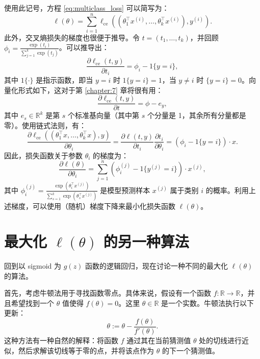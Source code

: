 使用此记号，方程 \eqref{eq:multiclass_loss} 可以简写为：
\begin{equation}
    \ell(\theta) = \sum_{i=1}^n \ell_{\text{ce}}((\theta_1^\top x^{(i)}, \dots, \theta_k^\top x^{(i)}), y^{(i)}).
\end{equation}
此外，交叉熵损失的梯度也很便于推导。令 $t = (t_1, \dots, t_k)$，并回顾 $\phi_i = \frac{\exp(t_i)}{\sum_{j=1}^k \exp(t_j)}$。可以推导出：
\begin{equation}
    \frac{\partial \ell_{\text{ce}}(t, y)}{\partial t_i} = \phi_i - {1}\{y=i\},
\end{equation}
其中 ${1}\{\cdot\}$ 是指示函数，即当 $y=i$ 时 ${1}\{y=i\} = 1$，当 $y \ne i$ 时 $\{y=i\} = 0$。向量化形式如下，这对于第 \ref{chapter:7} 章将很有用：
\begin{equation}
    \frac{\partial \ell_{\text{ce}}(t, y)}{\partial t} = \phi - e_y,\label{eq:2.17}
\end{equation}
其中 $e_s \in \mathbb{R}^k$ 是第 $s$ 个标准基向量（其中第 $s$ 个分量是 1，其余所有分量都是零）。使用链式法则，有：
\begin{equation}
    \frac{\partial \ell_{\text{ce}}((\theta_1^\top x, \dots, \theta_k^\top x), y)}{\partial \theta_i} = \frac{\partial \ell(t, y)}{\partial t_i} \frac{\partial t_i}{\partial \theta_i} = (\phi_i - {1}\{y=i\}) \cdot x.
\end{equation}
因此，损失函数关于参数 $\theta_i$ 的梯度为：
\begin{equation}
    \frac{\partial \ell(\theta)}{\partial \theta_i} = \sum_{j=1}^n (\phi_i^{(j)} - {1}\{y^{(j)}=i\}) \cdot x^{(j)},
\end{equation}
其中 $\phi_i^{(j)} = \frac{\exp(\theta_i^\top x^{(j)})}{\sum_{s=1}^k \exp(\theta_s^\top x^{(j)})}$ 是模型预测样本 $x^{(j)}$ 属于类别 $i$ 的概率。利用上述梯度，可以使用（随机）梯度下降来最小化损失函数 $\ell(\theta)$。

\section{最大化 \texorpdfstring{$\ell(\theta)$}{l(theta)} 的另一种算法}

回到以 sigmoid 为 $g(z)$ 函数的逻辑回归，现在讨论一种不同的最大化 $\ell(\theta)$ 的算法。

首先，考虑牛顿法用于寻找函数零点。具体来说，假设有一个函数 $f: \mathbb{R} \to \mathbb{R}$，并且希望找到一个 $\theta$ 值使得 $f(\theta) = 0$。这里 $\theta \in \mathbb{R}$ 是一个实数。牛顿法执行以下更新：
\[
    \theta := \theta - \frac{f(\theta)}{f'(\theta)}.
\]
这种方法有一种自然的解释：将函数 $f$ 通过其在当前猜测值 $\theta$ 处的切线进行近似，然后求解该切线等于零的点，并将该点作为 $\theta$ 的下一个猜测值。

